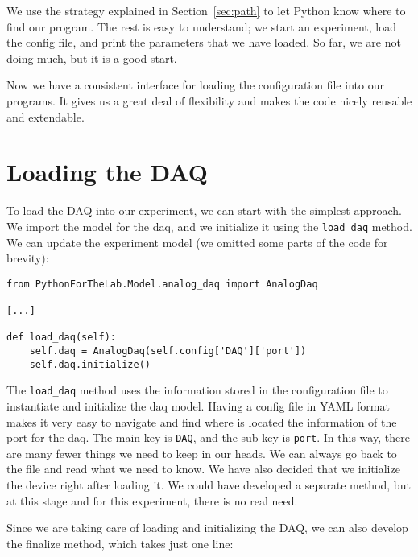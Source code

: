 We use the strategy explained in Section~\ref{sec:path} to let Python know where to find our program. The rest is easy to understand; we start an experiment, load the config file, and print the parameters that we have loaded. So far, we are not doing much, but it is a good start.

Now we have a consistent interface for loading the configuration file into our programs. It gives us a great deal of flexibility and makes the code nicely reusable and extendable.


\section{Loading the DAQ}\label{sec:loading-daq}
To load the DAQ into our experiment, we can start with the simplest approach. We import the model for the daq, and we initialize it using the \texttt{load\_daq} method. We can update the experiment model (we omitted some parts of the code for brevity):

\begin{verbatim}
from PythonForTheLab.Model.analog_daq import AnalogDaq

[...]

def load_daq(self):
    self.daq = AnalogDaq(self.config['DAQ']['port'])
    self.daq.initialize()
\end{verbatim}

The \texttt{load\_daq} method uses the information stored in the configuration file to instantiate and initialize the daq model. Having a config file in YAML format makes it very easy to navigate and find where is located the information of the port for the daq. The main key is \texttt{DAQ}, and the sub-key is \texttt{port}. In this way, there are many fewer things we need to keep in our heads. We can always go back to the file and read what we need to know. We have also decided that we initialize the device right after loading it. We could have developed a separate method, but at this stage and for this experiment, there is no real need.

Since we are taking care of loading and initializing the DAQ, we can also develop the finalize method, which takes just one line:

